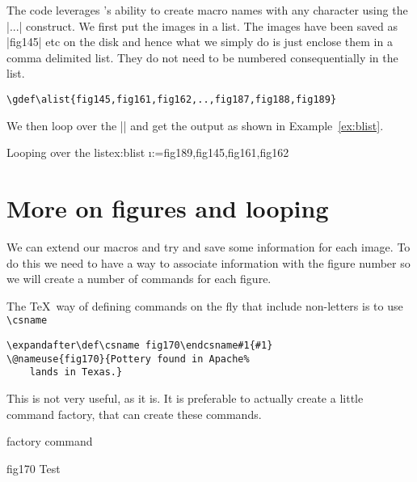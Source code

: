 \medskip

The code leverages \tex's ability to create macro names with any character using the |\csname...\endcsname| construct. We first put the
images in a list. The images have been saved as |fig145| etc on the disk and hence what we simply do is just enclose them in a comma delimited list. They do not need to be numbered consequentially in the list.

\begin{verbatim}
\gdef\alist{fig145,fig161,fig162,..,fig187,fig188,fig189}
\end{verbatim}

We then loop over the |\alist| and get the output as shown in Example~\ref{ex:blist}. 

\begin{texexample}{Looping over the list}{ex:blist}
\def\blist{fig189,fig145,fig161,fig162}
\@for \i:=\blist\do{%
  \expandafter\putgraphic{\i}%
}
\end{texexample}


\section{More on figures and looping}

We can extend our macros and try and save some information for each image. To do this we
need to have a way to associate information with the figure number so we will create a number of commands
for each figure.

The \TeX\ way of defining commands on the fly that include non-letters is to use \verb+\csname+
\begin{verbatim}
\expandafter\def\csname fig170\endcsname#1{#1}
\@nameuse{fig170}{Pottery found in Apache%
    lands in Texas.}
\end{verbatim}


This is not very useful, as it is. It is preferable to actually create a little command factory, that can create these
commands.

\begin{texexample}{}{factory command}
\bgroup
\gdef\commandfactory#1#2{
   \expandafter\def\csname #1\endcsname{#1}
   \expandafter\def\csname #1@caption\endcsname{#2}
}
\commandfactory{fig170}{Test}
\centering

\putgraphic{\csname fig170\endcsname}

\egroup
\end{texexample}

